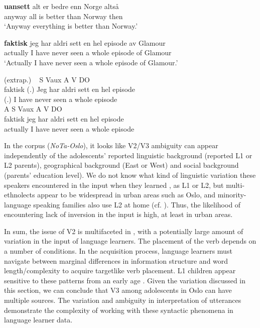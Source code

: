 \documentclass[output=paper,colorlinks,citecolor=brown,modfonts,nonflat]{../langscibook}
\begin{document}
\ea%
\settowidth{}
    \label{ex:emilsen:17}
\gll  \textbf{uansett} alt er bedre enn Norge altså\\
 anyway all is better than Norway then\\
 \glt ‘Anyway everything is better than Norway.’

\ex%
    \label{ex:emilsen:18}
\gll \textbf{faktisk} jeg har aldri sett en hel episode av Glamour\\
 actually I have never seen a whole episode of Glamour\\
 \glt ‘Actually I have never seen a whole episode of Glamour.’

 \ea\label{ex:emilsen:18a}\glll  (extrap.) ~ S Vaux A V DO\\
 faktisk (.) Jeg har aldri sett en hel episode\\
 [actually] (.) I have never seen a whole episode\\
 \ex \label{ex:emilsen:18b}\glll A S Vaux A V DO\\
 faktisk jeg har aldri sett en hel episode\\
 actually I have never seen a whole episode\\
\z
\z

\newpage
In the corpus (\textit{NoTa-Oslo}), it looks like V2/V3 ambiguity can appear independently of the adolescents’ reported linguistic background (reported L1 or L2 parents), geographical background (East or West) and social background (parents’ education level). We do not know what kind of linguistic variation these speakers encountered in the input when they learned , as L1 or L2, but multi-ethnolects appear to be widespread in urban areas such as Oslo, and minority-language speaking families also use L2  at home (cf. ). Thus, the likelihood of encountering lack of inversion in the input is high, at least in urban areas. 

In sum, the issue of V2 is multifaceted in , with a potentially large amount of variation in the input of language learners. The placement of the verb depends on a number of conditions. In the acquisition process, language learners must navigate between marginal differences in information structure and word length/complexity to acquire targetlike verb placement. L1 children appear sensitive to these patterns from an early age \citep[1854]{Westergaard2008}. Given the variation discussed in this section, we can conclude that V3 among adolescents in Oslo can have multiple sources. The variation and ambiguity in interpretation of utterances demonstrate the complexity of working with these syntactic phenomena in language learner data. 
\end{document}

